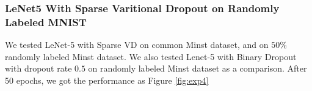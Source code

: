\documentclass{article}
\begin{document}
	\subsubsection{LeNet5 With Sparse Varitional Dropout on Randomly Labeled MNIST}
	We tested LeNet-5 with Sparse VD on common Minst dataset, and on $50\%$ randomly labeled Minst dataset. We also tested Lenet-5 with Binary Dropout with dropout rate $0.5$ on randomly labeled Minst dataset as a comparison. After 50 epochs, we got the performance as Figure {\ref{fig:exp4}}
		\begin{figure}[ht]
			\centering
\end{figure}
\end{document}
